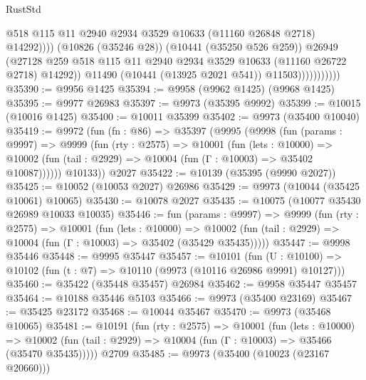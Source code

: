 \begin{lexlean}{RustStd}
\begin{coremodule}
                                    @518
                                    @115
                                    @11
                                    @2940
                                    @2934
                                    @3529
                                    @10633
                                    (@11160 @26848 @2718)
                                    @14292))))
                            (@10826 (@35246 @28))
                            (@10441 (@35250 @526 @259))
                            @26949
                            (@27128
                              @259
                              @518
                              @115
                              @11
                              @2940
                              @2934
                              @3529
                              @10633
                              (@11160 @26722 @2718)
                              @14292))
                          @11490
                          (@10441 (@13925 @2021 @541))
                          @11503)))))))))))
@35390 := @9956 @1425
@35394 := @9958 (@9962 @1425) (@9968 @1425)
@35395 := @9977 @26983
@35397 := @9973 (@35395 @9992)
@35399 := @10015 (@10016 @1425)
@35400 := @10011 @35399
@35402 := @9973 (@35400 @10040)
@35419 := @9972
    (fun (fn : @86) =>
    @35397
      (@9995
        (@9998
          (fun (params : @9997) =>
          @9999
            (fun (rty : @2575) =>
            @10001
              (fun (lets : @10000) =>
              @10002 (fun (tail : @2929) => @10004 (fun (Γ : @10003) => @35402 @10087))))))
        @10133))
    @2027
@35422 := @10139 (@35395 (@9990 @2027))
@35425 := @10052 (@10053 @2027) @26986
@35429 := @9973 (@10044 (@35425 @10061) @10065)
@35430 := @10078 @2027
@35435 := @10075 (@10077 @35430 @26989 @10033 @10035)
@35446 := fun (params : @9997) =>
  @9999
    (fun (rty : @2575) =>
    @10001
      (fun (lets : @10000) =>
      @10002 (fun (tail : @2929) => @10004 (fun (Γ : @10003) => @35402 (@35429 @35435)))))
@35447 := @9998 @35446
@35448 := @9995 @35447
@35457 := @10101
    (fun (U : @10100) => @10102 (fun (t : @7) => @10110 (@9973 (@10116 @26986 @9991) @10127)))
@35460 := @35422 (@35448 @35457) @26984
@35462 := @9958 @35447 @35457
@35464 := @10188 @35446 @5103
@35466 := @9973 (@35400 @23169)
@35467 := @35425 @23172
@35468 := @10044 @35467
@35470 := @9973 (@35468 @10065)
@35481 := @10191
    (fun (rty : @2575) =>
    @10001
      (fun (lets : @10000) =>
      @10002 (fun (tail : @2929) => @10004 (fun (Γ : @10003) => @35466 (@35470 @35435)))))
    @2709
@35485 := @9973 (@35400 (@10023 (@23167 @20660)))

\end{coremodule}
\end{lexlean}
